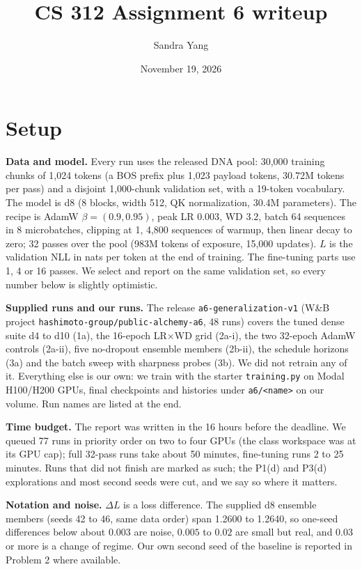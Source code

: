 \documentclass[10pt,letterpaper]{article}
\title{\vspace{-2em}CS 312 Assignment 6 writeup}
\author{Sandra Yang}
\date{November 19, 2026}
\newcommand{\lead}[1]{\textbf{#1}}
\begin{document}
\maketitle

\section*{Setup}

\lead{Data and model.} Every run uses the released DNA pool: 30,000 training chunks of 1,024 tokens (a BOS prefix plus 1,023 payload tokens, 30.72M tokens per pass) and a disjoint 1,000-chunk validation set, with a 19-token vocabulary. The model is d8 (8 blocks, width 512, QK normalization, 30.4M parameters). The recipe is AdamW $\beta=(0.9,0.95)$, peak LR $0.003$, WD $3.2$, batch 64 sequences in 8 microbatches, clipping at 1, 4,800 sequences of warmup, then linear decay to zero; 32 passes over the pool (983M tokens of exposure, 15,000 updates). $L$ is the validation NLL in nats per token at the end of training. The fine-tuning parts use 1, 4 or 16 passes. We select and report on the same validation set, so every number below is slightly optimistic.

\lead{Supplied runs and our runs.} The release \texttt{a6-generalization-v1} (W\&B project \texttt{hashimoto-group/public-alchemy-a6}, 48 runs) covers the tuned dense suite d4 to d10 (1a), the 16-epoch LR$\times$WD grid (2a-i), the two 32-epoch AdamW controls (2a-ii), five no-dropout ensemble members (2b-ii), the schedule horizons (3a) and the batch sweep with sharpness probes (3b). We did not retrain any of it. Everything else is our own: we train with the starter \texttt{training.py} on Modal H100/H200 GPUs, final checkpoints and histories under \texttt{a6/<name>} on our volume. Run names are listed at the end.

\lead{Time budget.} The report was written in the 16 hours before the deadline. We queued 77 runs in priority order on two to four GPUs (the class workspace was at its GPU cap); full 32-pass runs take about 50 minutes, fine-tuning runs 2 to 25 minutes. Runs that did not finish are marked as such; the P1(d) and P3(d) explorations and most second seeds were cut, and we say so where it matters.

\lead{Notation and noise.} $\Delta L$ is a loss difference. The supplied d8 ensemble members (seeds 42 to 46, same data order) span 1.2600 to 1.2640, so one-seed differences below about $0.003$ are noise, $0.005$ to $0.02$ are small but real, and $0.03$ or more is a change of regime. Our own second seed of the baseline is reported in Problem 2 where available.
\end{document}

